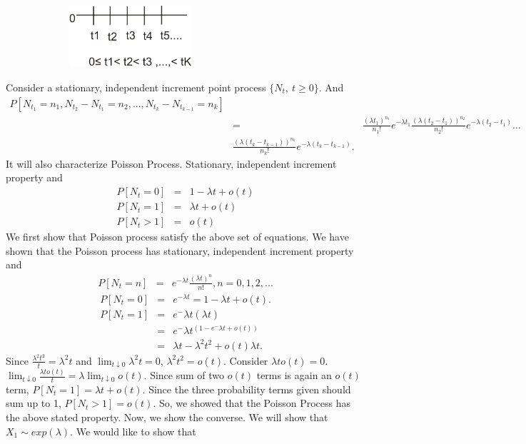 \documentclass[a4paper,10pt]{article}
\theoremstyle{plain}
\theoremstyle{definition}
\begin{document}
\begin{figure}[h!]
\center
  \includegraphics[width=2.8in, height=0.9in]{Figures/SPQT.png}\\
\end{figure}
\noindent Consider a stationary, independent increment point process $\{N_t,~t\geq 0\}$. And  \\
\begin{eqnarray*}
  P[N_{t_{1}}= n_{1},N_{t_{2}}-N_{t_{1}}= n_{2},..., N_{t_{k}}-N_{t_{k-1}} =n_{k}] \\
   &=& \frac{(\lambda t_1)^{n_{1}}}{n_1!} e^{-\lambda t_{1}} \frac{(\lambda(t_{2}-t_{1}))^{n_{2}}}{n_{2}!} e^{-\lambda (t_{2}-t_{1})} \hdots\\
   & \frac{(\lambda(t_{k}-t_{k-1}))^{n_k}}{n_{k}!} e^{-\lambda (t_{k}-t_{k-1})}.
\end{eqnarray*}
\noindent It will also characterize Poisson Process. Stationary, independent increment property and\\
\begin{eqnarray*}\label{eqn1}
P[N_{t}=0] &=& 1-\lambda t + o(t) \\
  P[N_{t}=1] &=& \lambda t + o(t) \\
  P[N_{t}>1] &=& o(t)
\end{eqnarray*}
We first show that Poisson process satisfy the above set of equations. We have shown that the Poisson process has stationary, independent increment property  and 
\begin{eqnarray*}
  P[N_t= n] &=&  e^{-\lambda t} \frac{(\lambda t)^{n}}{n!}, n=0,1,2,...
  \end{eqnarray*}
  \begin{eqnarray*}
  P[N_{t}=0] &=& e^{-\lambda t} = 1-\lambda t + o(t).\\
   P[N_{t}=1]&=& e^-\lambda t (\lambda t) \\
  &=& e^-\lambda t^{(1-e^-\lambda t+ o(t))}\\
   &=& \lambda t- \lambda^{2} t^{2}+ o(t) \lambda t.
   \end{eqnarray*}
   Since $\frac{\lambda^{2} t^{2}}{t} =  \lambda^{2} t$ and $\lim _{t\downarrow 0}\lambda^{2} t= 0$, $\lambda^{2} t^{2} =o(t)$. Consider  $\lambda t o(t) = 0$.   $\lim _{t\downarrow 0}\frac{\lambda t o(t)}{t} = \lambda \lim _{t\downarrow 0} o(t)$. Since sum of two $o(t)$ terms is again an $o(t)$ term, $P[N_{t}=1]= \lambda t + o(t)$. Since the three probability terms given should sum up to 1, $ P[N_{t}>1]=o(t)$. So, we showed that the  Poisson Process has the above stated property. Now, we show the converse. We will show that $X_{1}\sim exp (\lambda )$. We would like to show that\\
\end{document}
